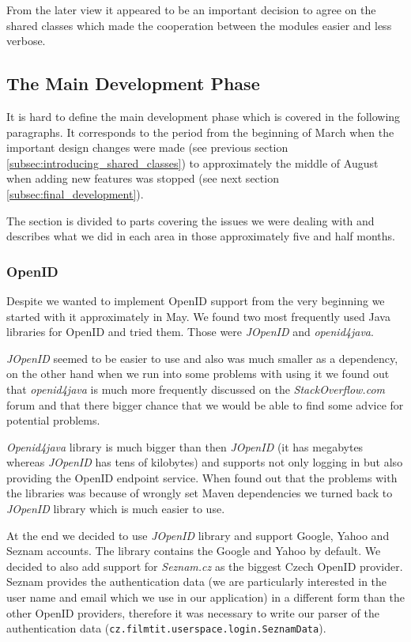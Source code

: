 From the later view it appeared to be an important decision to agree on the shared classes which made the cooperation between the modules easier and less verbose. 

\subsection{The Main Development Phase}

It is hard to define the main development phase which is covered in the following paragraphs. It corresponds to the period from the beginning of March when the important design changes were made (see previous section \ref{subsec:introducing_shared_classes}) to approximately the middle of August when adding new features was stopped (see next section \ref{subsec:final_development}).

The section is divided to parts covering the issues we were dealing with and describes what we did in each area in those approximately five and half months.

\subsubsection{OpenID}
\label{subsubsec:openid}

Despite we wanted to implement OpenID support from the very beginning we started with it approximately in May. We found two most frequently used Java libraries for OpenID and tried them. Those were \emph{JOpenID} and \emph{openid4java}.

\emph{JOpenID} seemed to be easier to use and also was much smaller as a dependency, on the other hand when we run into some problems with using it we found out that \emph{openid4java} is much more frequently discussed on the \emph{StackOverflow.com} forum and that there bigger chance that we would be able to find some advice for potential problems.

\emph{Openid4java} library is much bigger than then \emph{JOpenID} (it has megabytes whereas \emph{JOpenID} has tens of kilobytes) and supports not only logging in but also providing the OpenID endpoint service. When found out that the problems with the libraries was because of wrongly set Maven dependencies we turned back to \emph{JOpenID} library which is much easier to use.

At the end we decided to use \emph{JOpenID} library and support Google, Yahoo and Seznam accounts. The library contains the Google and Yahoo by default. We decided to also add support for \emph{Seznam.cz} as the biggest Czech OpenID provider. Seznam provides the authentication data (we are particularly interested in the user name and email which we use in our application) in a different form than the other OpenID providers, therefore it was necessary to write our parser of the authentication data ({\tt{cz.filmtit.userspace.login.SeznamData}}).

